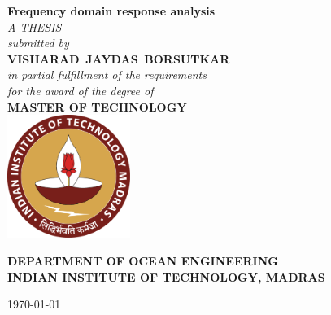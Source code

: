 \begin{titlepage}
\centering
{\doublespacing \Huge \bfseries Frequency domain response analysis} %
\\ [1.2cm]


\emph{\large A THESIS } %
\\[1cm] 

\emph{\large submitted by}
\\[1cm]

{\large \bfseries VISHARAD\, JAYDAS\, BORSUTKAR}  %
\\[1cm] 

\emph{\large in partial fulfillment of the requirements \\ for the award of the degree of }
\\ [1 cm]


{\large \bf MASTER OF TECHNOLOGY}
\\[1.5cm]


\includegraphics[width=4cm]{photos/logo.pdf}


\vspace{1.5 cm}
\begin{minipage}{1\textwidth}
\begin{center} \large
\textbf {DEPARTMENT OF OCEAN ENGINEERING \\
INDIAN INSTITUTE OF TECHNOLOGY, MADRAS} %
\\[0.3cm]

\end{center}
\end{minipage} 

\vspace{1 cm}
{\large \today}
\end{titlepage}